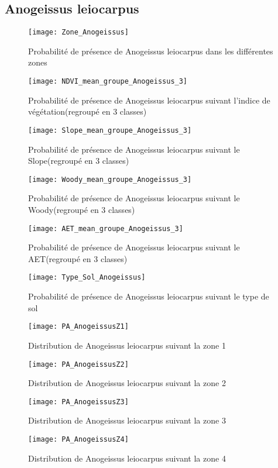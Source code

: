 \documentclass[a4paper, oneside, 12pt]{book}
\begin{document}
\subsection{Anogeissus leiocarpus}
\begin{figure}[H]
	\centering
	\caption{Probabilité de présence de Anogeissus leiocarpus dans les différentes zones}
	\texttt{[image: Zone\_Anogeissus]}	
\end{figure}


\begin{figure}[H]
	\centering
	\caption{Probabilité de présence de Anogeissus leiocarpus suivant l'indice de végétation(regroupé en 3 classes)}
	\texttt{[image: NDVI\_mean\_groupe\_Anogeissus\_3]}
\end{figure}


\begin{figure}[H]
	\centering
	\caption{Probabilité de présence de Anogeissus leiocarpus suivant le Slope(regroupé en 3 classes)}
	\texttt{[image: Slope\_mean\_groupe\_Anogeissus\_3]}
\end{figure}


\begin{figure}[H]
	\centering
	\caption{Probabilité de présence de Anogeissus leiocarpus suivant le Woody(regroupé en 3 classes)}
	\texttt{[image: Woody\_mean\_groupe\_Anogeissus\_3]}
\end{figure}


\begin{figure}[H]
	\centering
	\caption{Probabilité de présence de Anogeissus leiocarpus suivant le AET(regroupé en 3 classes)}
	\texttt{[image: AET\_mean\_groupe\_Anogeissus\_3]}
\end{figure}
\begin{figure}[H]
	\centering
	\caption{Probabilité de présence de Anogeissus leiocarpus suivant le type de sol}
	\texttt{[image: Type\_Sol\_Anogeissus]}
\end{figure}
\begin{figure}[H]
	\centering
	\caption{Distribution de Anogeissus leiocarpus suivant la zone 1}
	\texttt{[image: PA\_AnogeissusZ1]}	
\end{figure}
\begin{figure}[H]
	\centering
	\caption{Distribution de Anogeissus leiocarpus suivant la zone 2}
	\texttt{[image: PA\_AnogeissusZ2]}	
\end{figure}
\begin{figure}[H]
	\centering
	\caption{Distribution de Anogeissus leiocarpus suivant la zone 3}
	\texttt{[image: PA\_AnogeissusZ3]}	
\end{figure}
\begin{figure}[H]
	\centering
	\caption{Distribution de Anogeissus leiocarpus suivant la zone 4}
	\texttt{[image: PA\_AnogeissusZ4]}	
\end{figure}
\end{document}

